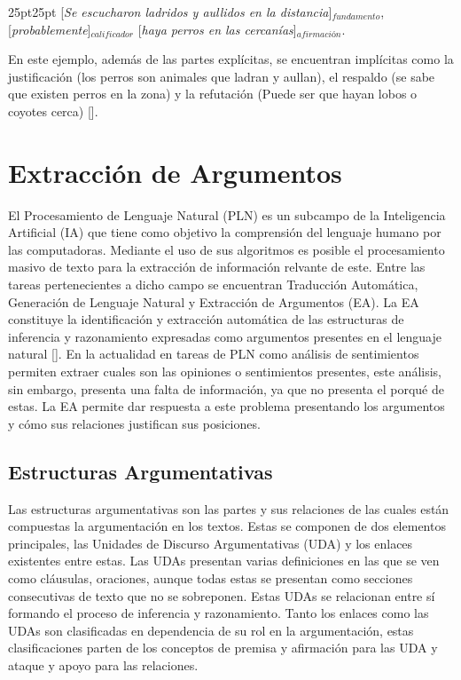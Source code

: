 \begin{adjustwidth}{25pt}{25pt}
    [\emph{Se escucharon ladridos y aullidos en la distancia}]$_{fundamento}$, 
    [\emph{probablemente}]$_{calificador}$ 
    [\emph{haya perros en las cercanías}]$_{afirmación}$.
\end{adjustwidth}

En este ejemplo, además de las partes explícitas, se encuentran implícitas como la justificación 
(los perros son animales que ladran y aullan), el respaldo (se sabe que existen perros en la zona) y 
la refutación (Puede ser que hayan lobos o coyotes cerca) [\cite{toulminArgument}].
  
\section{Extracción de Argumentos}

El Procesamiento de Lenguaje Natural (PLN) es un 
subcampo de la Inteligencia Artificial (IA) que tiene como objetivo la comprensión del lenguaje humano por 
las computadoras. 
Mediante el uso de sus algoritmos es posible el procesamiento masivo de texto para la extracción de información 
relvante de este. Entre las tareas pertenecientes a dicho campo se encuentran Traducción Automática, 
Generación de Lenguaje Natural y Extracción de Argumentos (EA). La EA constituye la identificación y extracción 
automática de las estructuras de inferencia y 
razonamiento expresadas como argumentos presentes en el lenguaje natural [\cite{lawrence2020argument}].
En la actualidad en tareas de PLN como análisis de sentimientos permiten 
extraer cuales son las opiniones o sentimientos presentes, este análisis, sin embargo, presenta una falta 
de información, ya que no presenta el porqué de estas. La EA permite dar respuesta a este problema presentando
los argumentos y cómo sus relaciones justifican sus posiciones.

\subsection{Estructuras Argumentativas}


Las estructuras argumentativas son las partes y sus relaciones de las cuales están compuestas la argumentación en los textos.
Estas se componen de dos elementos principales, las Unidades de Discurso Argumentativas (UDA) y los enlaces
existentes entre estas. 
Las UDAs presentan varias definiciones en las que se ven como cláusulas, oraciones, aunque
todas estas se presentan como secciones consecutivas de texto que no se sobreponen. Estas UDAs se relacionan entre 
sí formando el proceso de inferencia y razonamiento.
Tanto los enlaces como las UDAs son clasificadas en dependencia de su rol en la argumentación, estas clasificaciones 
parten de los conceptos de premisa y afirmación para las UDA y ataque y apoyo para las relaciones. 


